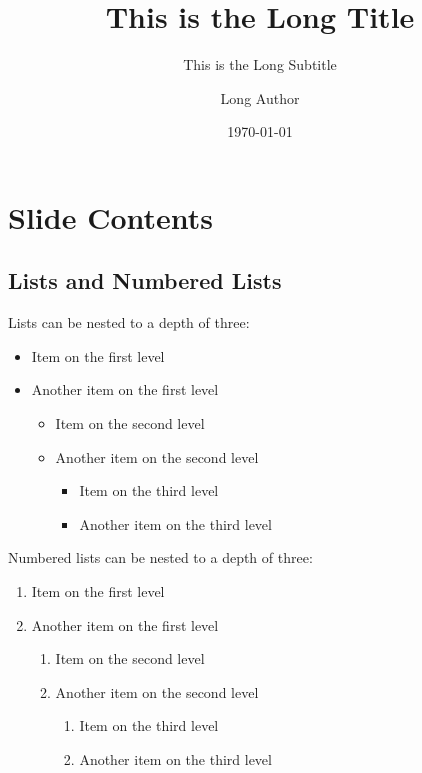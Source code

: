 \documentclass[
	aspectratio=169, %
	8pt, %
]{beamer}
\title[Short Title]{This is the Long Title} %
\subtitle[Short Subtitle]{This is the Long Subtitle} %
\author[Short Author]{Long Author} %
\date{\today} %
\begin{document}

\section{Slide Contents}

\subsection{Lists and Numbered Lists}
\begin{frame}{\insertsubsection}
	\begin{fancycolumns}
		Lists can be nested to a depth of three:
		\begin{itemize}
			\item Item on the first level
			\item Another item on the first level
			\begin{itemize}
				\item Item on the second level
				\item Another item on the second level
			\begin{itemize}
			\item Item on the third level
			\item Another item on the third level
			\end{itemize}
		\end{itemize}
	\end{itemize}
	\nextcolumn
	Numbered lists can be nested to a depth of three:
	\begin{enumerate}
		\item Item on the first level
		\item Another item on the first level
		\begin{enumerate}
			\item Item on the second level
			\item Another item on the second level
				\begin{enumerate}
					\item Item on the third level
					\item Another item on the third level
				\end{enumerate}
			\end{enumerate}
		\end{enumerate}
	\end{fancycolumns}
\end{frame}
\end{document}
